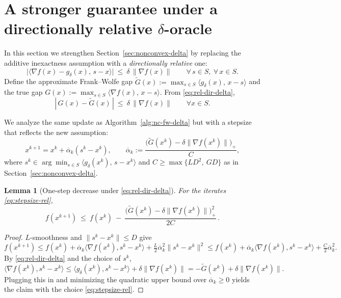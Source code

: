 \documentclass[smallextended]{svjour3}
\newtheorem{lem}[theorem]{Lemma}
\begin{document}
\section{A stronger guarantee under a directionally relative \texorpdfstring{$\delta$}{delta}-oracle}\label{sec:rel-delta}
In this section we strengthen Section~\ref{sec:nonconvex-delta} by replacing the additive inexactness assumption with a \emph{directionally relative} one:
\begin{equation}\label{eq:rel-dir-delta}
\big|\langle \nabla f(x)-g_\delta(x),\,s-x\rangle\big|\ \le\ \delta \,\|\nabla f(x)\|\qquad\forall\,s\in S,\ \forall\,x\in S .
\end{equation}
Define the approximate Frank--Wolfe gap $\tilde G(x):=\max_{s\in S}\langle g_\delta(x),\,x-s\rangle$ and the true gap $G(x):=\max_{s\in S}\langle \nabla f(x),\,x-s\rangle$. From \eqref{eq:rel-dir-delta},
\begin{equation}\label{eq:gap-closeness-rel}
|\,G(x)-\tilde G(x)\,|\ \le\ \delta\,\|\nabla f(x)\|\qquad\forall x\in S.
\end{equation}

We analyze the same update as Algorithm~\ref{alg:nc-fw-delta} but with a stepsize that reflects the new assumption:
\begin{equation}\label{eq:stepsize-rel}
x^{k+1}=x^k+\overline\alpha_k(s^k-x^k),\qquad
\overline\alpha_k:=\frac{\big(\tilde G(x^k)-\delta\|\nabla f(x^k)\|\big)_+}{C},
\end{equation}
where $s^k\in\arg\min_{s\in S}\langle g_\delta(x^k),\,s-x^k\rangle$ and $C\ge \max\{L D^2,\ G D\}$ as in Section~\ref{sec:nonconvex-delta}.

\begin{lem}[One-step decrease under \eqref{eq:rel-dir-delta}]\label{lem:rel-one-step}
For the iterates \eqref{eq:stepsize-rel},
\[
f(x^{k+1})\ \le\ f(x^k)\ -\ \frac{\big(\tilde G(x^k)-\delta\|\nabla f(x^k)\|\big)_+^2}{2C}\, .
\]
\end{lem}
\begin{proof}
$L$-smoothness and $\|s^k-x^k\|\le D$ give
\[
f(x^{k+1})\le f(x^k)+\overline\alpha_k\langle\nabla f(x^k),s^k-x^k\rangle+\tfrac{L}{2}\overline\alpha_k^2\|s^k-x^k\|^2
\le f(x^k)+\overline\alpha_k\langle\nabla f(x^k),s^k-x^k\rangle+\tfrac{C}{2}\overline\alpha_k^2.
\]
By \eqref{eq:rel-dir-delta} and the choice of $s^k$,
\(
\langle\nabla f(x^k),s^k-x^k\rangle
\le \langle g_\delta(x^k),s^k-x^k\rangle+\delta\|\nabla f(x^k)\|
= -\tilde G(x^k)+\delta\|\nabla f(x^k)\|.
\)
Plugging this in and minimizing the quadratic upper bound over $\overline\alpha_k\ge 0$ yields the claim with the choice \eqref{eq:stepsize-rel}.
\end{proof}
\end{document}
